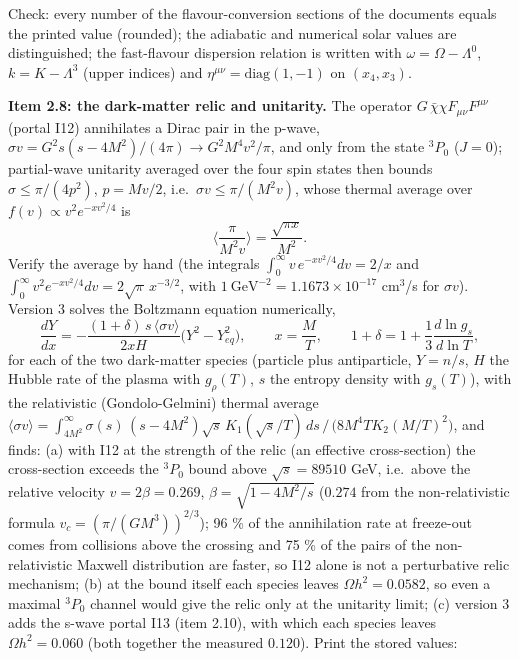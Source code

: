 \documentclass[
  10pt,
]{article}
\begin{document}
Check: every number of the flavour-conversion sections of the documents
equals the printed value (rounded); the adiabatic and numerical solar
values are distinguished; the fast-flavour dispersion relation is
written with \(\omega = \Omega - \Lambda^0\), \(k = K - \Lambda^3\)
(upper indices) and \(\eta^{\mu\nu} = \mathrm{diag}(1, -1)\) on
\((x_4, x_3)\).

\textbf{Item 2.8: the dark-matter relic and unitarity.} The operator
\(G\,\bar\chi\chi F_{\mu\nu}F^{\mu\nu}\) (portal I12) annihilates a
Dirac pair in the p-wave,
\(\sigma v = G^2s(s - 4M^2)/(4\pi) \to G^2M^4v^2/\pi\), and only from
the state \(^3P_0\) (\(J = 0\)); partial-wave unitarity averaged over
the four spin states then bounds \(\sigma \le \pi/(4p^2)\),
\(p = Mv/2\), i.e.~\(\sigma v \le \pi/(M^2v)\), whose thermal average
over \(f(v) \propto v^2e^{-xv^2/4}\) is
\[ \Big\langle\frac{\pi}{M^2v}\Big\rangle = \frac{\sqrt{\pi x}}{M^2} . \]
Verify the average by hand (the integrals
\(\int_0^\infty v\,e^{-xv^2/4}dv = 2/x\) and
\(\int_0^\infty v^2e^{-xv^2/4}dv = 2\sqrt\pi\,x^{-3/2}\), with
\(1\ \text{GeV}^{-2} = 1.1673\times10^{-17}\) cm\(^3\)/s for
\(\sigma v\)). Version 3 solves the Boltzmann equation numerically,
\[ \frac{dY}{dx} = -\frac{(1 + \delta)\,s\,\langle\sigma v\rangle}{2xH}\big(Y^2 - Y_{eq}^2\big),\qquad x = \frac{M}{T},\qquad
   1 + \delta = 1 + \frac13\frac{d\ln g_s}{d\ln T}, \] for each of the
two dark-matter species (particle plus antiparticle, \(Y = n/s\), \(H\)
the Hubble rate of the plasma with \(g_\rho(T)\), \(s\) the entropy
density with \(g_s(T)\)), with the relativistic (Gondolo-Gelmini)
thermal average
\(\langle\sigma v\rangle = \int_{4M^2}^\infty \sigma(s)\,(s - 4M^2)\sqrt s\,K_1(\sqrt s/T)\,ds\,/\,\big(8M^4TK_2(M/T)^2\big)\),
and finds: (a) with I12 at the strength of the relic (an effective
cross-section) the cross-section exceeds the \(^3P_0\) bound above
\(\sqrt s = 89510\) GeV, i.e.~above the relative velocity
\(v = 2\beta = 0.269\), \(\beta = \sqrt{1 - 4M^2/s}\) (\(0.274\) from
the non-relativistic formula \(v_c = (\pi/(GM^3))^{2/3}\)); 96 \% of the
annihilation rate at freeze-out comes from collisions above the crossing
and 75 \% of the pairs of the non-relativistic Maxwell distribution are
faster, so I12 alone is not a perturbative relic mechanism; (b) at the
bound itself each species leaves \(\Omega h^2 = 0.0582\), so even a
maximal \(^3P_0\) channel would give the relic only at the unitarity
limit; (c) version 3 adds the s-wave portal I13 (item 2.10), with which
each species leaves \(\Omega h^2 = 0.060\) (both together the measured
\(0.120\)). Print the stored values:
\end{document}
